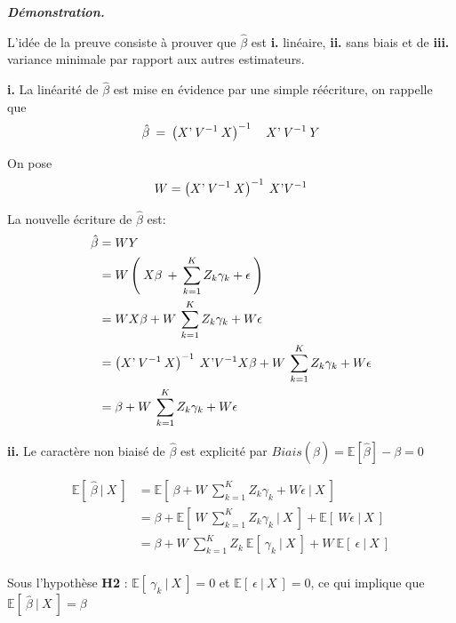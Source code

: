\documentclass[11pt,fleqn]{book} %
\begin{document}
\vspace{1em}

\textbf{\textit{Démonstration.}}

\vspace{0.5em}

L'idée de la preuve consiste à prouver que $\hat{\beta}$ est \textbf{i.} linéaire, \textbf{ii.} sans biais et de \textbf{iii.} variance minimale par rapport aux autres estimateurs.

\vspace{0.5em}

\textbf{i.} La linéarité de $\hat{\beta}$ est mise en évidence par une simple réécriture, on rappelle que
\[
\hat{\beta}\:=\:\left(  X\textnormal{'}\:V^{-1} \: X \right)^{-1} \quad X\textnormal{'} \:V^{-1}\: Y
\]

On pose 
\[
W=\left(  X\textnormal{'}\:V^{-1} \: X \right)^{-1} \: X\textnormal{'}V^{-1}
\]

La nouvelle écriture de $\hat{\beta}$ est:
\begin{align*}
\hat{\beta} &= W Y\\
	&= W \left( \:X\beta\:+\:\sum_{k=1}^{K} Z_k \gamma_k + \epsilon\: \right) \\
    &= W X\beta+ W \:\sum_{k=1}^{K} Z_k \gamma_k +W\epsilon\\
    &= \left(  X\textnormal{'}\:V^{-1} \: X \right)^{-1} \: X\textnormal{'}V^{-1}X\beta + W \:\sum_{k=1}^{K} Z_k \gamma_k + W\epsilon\\
    &= \beta +  W \:\sum_{k=1}^{K} Z_k \gamma_k +W\epsilon 
\end{align*}


\vspace{0.5em}

\textbf{ii.} Le caractère non biaisé de $\hat{\beta}$ est explicité par $Biais(\hat{\beta})=\mathbb{E}[\hat{\beta}]-\beta=0$

\begin{align*}
\mathbb{E}[\:\hat{\beta}\:|\:X \:]&=\mathbb{E}[\:\beta +  W \:\sum_{k=1}^{K} Z_k \gamma_k + W\epsilon \:|\: X\: ]\\
	&= \beta + \mathbb{E}[\:W \:\sum_{k=1}^{K} Z_k \gamma_k  \:|\: X\:] + \mathbb{E}[\: W\epsilon \:|\: X\:]\\
    &=  \beta + W\:\sum_{k=1}^{K} Z_k \:\mathbb{E}[\: \gamma_k \:|\: X\:]+ W\:\mathbb{E}[\: \epsilon \:|\: X\:]\\
\end{align*}

Sous l'hypothèse \textbf{H2} : $\mathbb{E}[\: \gamma_k \:|\: X\:]=0$ \:et\: $\mathbb{E}[\: \epsilon \:|\: X\:]=0$, ce qui implique que $\mathbb{E}[\:\hat{\beta}\:|\:X \:]=\beta$\\
\end{document}
